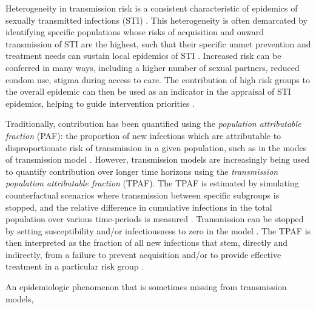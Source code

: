 Heterogeneity in transmission risk is a consistent characteristic of
epidemics of sexually transmitted infections (STI) \citep{Anderson1991}.
This heterogeneity is often demarcated by identifying
specific populations whose risks of acquisition and onward transmission of STI are the highest,
such that their specific unmet prevention and treatment needs
can sustain local epidemics of STI \citep{Yorke1978}.
Increased risk can be conferred in many ways, including
a higher number of sexual partners,
reduced condom use,
stigma during access to care.
The contribution of high risk groups to the overall epidemic
can then be used as an indicator in the appraisal of STI epidemics,
helping to guide intervention priorities
\citep{Shubber2014,Mishra2016}.
\par
Traditionally, contribution has been quantified using the
\textit{population attributable fraction} (PAF):
the proportion of new infections which are
attributable to disproportionate risk of transmission in a given population,
such as in the modes of transmission model \citep{Case2012,Mishra2014a}.
However, transmission models are increasingly being used to quantify
contribution over longer time horizons
using the \textit{transmission population attributable fraction} (TPAF).
The TPAF is estimated by
simulating counterfactual scenarios where transmission
between specific subgroups is stopped, and
the relative difference in cumulative infections in the total population
over various time-periods is measured \citep{Mishra2016,Mukandavire2018}.
Transmission can be stopped by
setting susceptibility and/or infectiousness to zero in the model \citep{Mishra2012}.
The TPAF is then interpreted as
the fraction of all new infections that stem, directly and indirectly, from
a failure to prevent acquisition and/or to provide effective treatment
in a particular risk group \citep{Mishra2016}.
\par
An epidemiologic phenomenon that is sometimes missing from transmission models,
